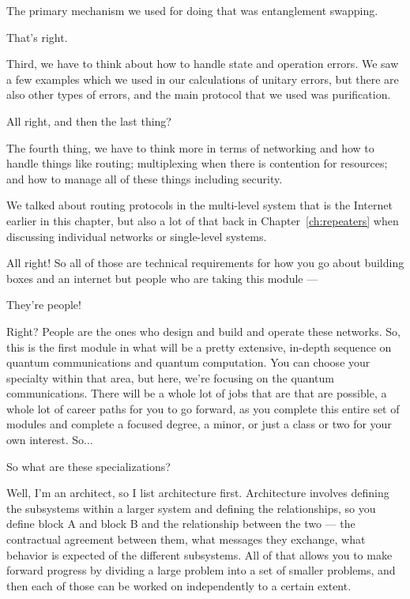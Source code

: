 \rrr The primary mechanism we used for doing that was entanglement swapping. 

\mmm That's right.

Third, we have to think about how to handle state and operation errors. We saw a few examples which we used in our calculations of unitary errors, but there are also other types of errors, and the main protocol that we used was purification.

\rrr All right, and then the last thing?

\mmm The fourth thing, we have to think more in terms of networking and how to handle things like routing; multiplexing when there is contention for resources; and how to manage all of these things including security.

\rrr We talked about routing protocols in the multi-level system that is the Internet earlier in this chapter, but also a lot of that back in Chapter~\ref{ch:repeaters} when discussing individual networks or single-level systems.

All right! So all of those are technical requirements for how you go about building boxes and an internet but people who are taking this module ---

\mmm They're people! 

\rrr Right? People are the ones who design and build and operate these networks. So, this is the first module in what will be a pretty extensive, in-depth sequence on quantum communications and quantum computation. You can choose your specialty within that area, but here, we're focusing on the quantum communications. There will be a whole lot of jobs that are that are possible, a whole lot of career paths for you to go forward, as you complete this entire set of modules and complete a focused degree, a minor, or just a class or two for your own interest. So...

\mmm So what are these specializations?

\rrr Well, I'm an architect, so I list architecture first. Architecture involves defining the subsystems within a larger system and defining the relationships, so you define block A and block B and the relationship between the two --- the contractual agreement between them, what messages they exchange, what behavior is expected of the different subsystems. All of that allows you to make forward progress by dividing a large problem into a set of smaller problems, and then each of those can be worked on independently to a certain extent.

